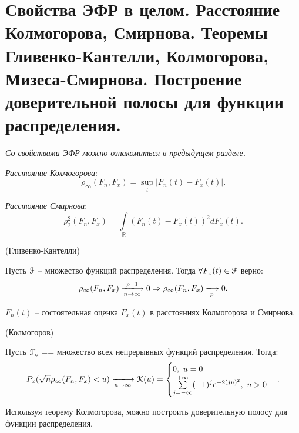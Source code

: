 \section{Свойства ЭФР в целом. Расстояние Колмогорова, Смирнова. Теоремы
Гливенко-Кантелли, Колмогорова, Мизеса-Смирнова. Построение доверительной
полосы для функции распределения.}

\textit{Со свойствами ЭФР можно ознакомиться в предыдущем разделе.}

\begin{definition}
  \textit{Расстояние Колмогорова}:
  \[
    \rho_{\infty} (F_n, F_x) = \sup_{t}|F_n(t) - F_x(t)|
  .\]
\end{definition}

\begin{definition}
  \textit{Расстояние Смирнова}:
  \[
    \rho^{2}_{2} (F_n, F_x) = \int\limits_{\mathbb{R}}(F_n(t) - F_x(t))^2
    dF_x(t)
  .\]
\end{definition}

\begin{theorem}(Гливенко-Кантелли)

  Пусть $\mathcal{F}$ -- множество функций распределения.
  Тогда $\forall F_x(t) \in \mathcal{F}$ верно:
  \[
    \rho_{\infty} (F_n, F_x) \xlongrightarrow[n \to \infty]{p=1} 0 \Rightarrow
    \rho_{\infty} (F_n, F_x) \xlongrightarrow[p]{} 0
  .\]

\end{theorem}

\begin{remark}
  $F_n(t)$ -- состоятельная оценка $F_x(t)$ в расстояниях Колмогорова и
  Смирнова.
\end{remark}

\begin{theorem}(Колмогоров)

  Пусть $\mathcal{F}_c$ == множество всех непрерывных функций распределения.
  Тогда:
  \[
    P_x(\sqrt{n} \rho_{\infty} (F_n, F_x) < u) \xlongrightarrow[n \to \infty]{}
    \mathcal{K}(u) = \begin{cases}
      0,~ u = 0\\
      \sum\limits_{j = -\infty}^{+\infty} (-1)^j e^{-2 (ju)^2},~ u > 0
    \end{cases}
  .\]

\end{theorem}

\begin{remark}
  Используя теорему Колмогорова, можно построить доверительную полосу для
  функции распределения.
\end{remark}

